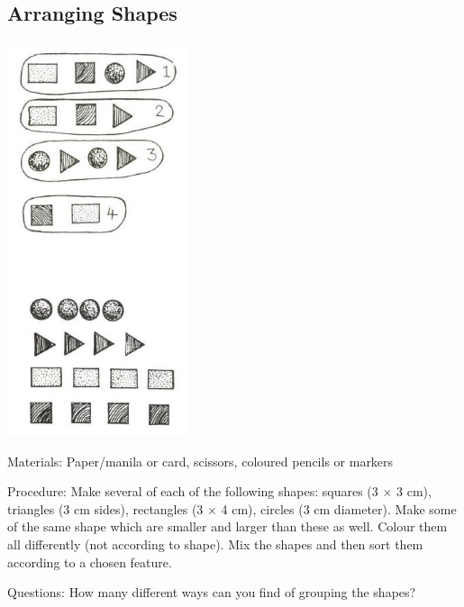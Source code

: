 \begin{multicols}{2}
\subsection{Arranging Shapes}

\begin{center}
\includegraphics[width=0.4\textwidth]{./img/source/arranging-shapes.jpg}
\end{center}

\begin{description*}
\item[Materials:]{Paper/manila or card, scissors, coloured pencils or markers}
\item[Procedure:]{Make several of each of the following
shapes: squares (3 $\times$ 3 cm), triangles (3 cm sides),
rectangles (3 $\times$ 4 cm), circles (3 cm diameter). Make some of the same shape which are smaller and larger than these as well. Colour them all differently (not according to shape).
Mix the shapes and then sort them according to
a chosen feature. }
\item[Questions:]{How many different ways can
you find of grouping the shapes?}
\end{description*}


\end{multicols}
